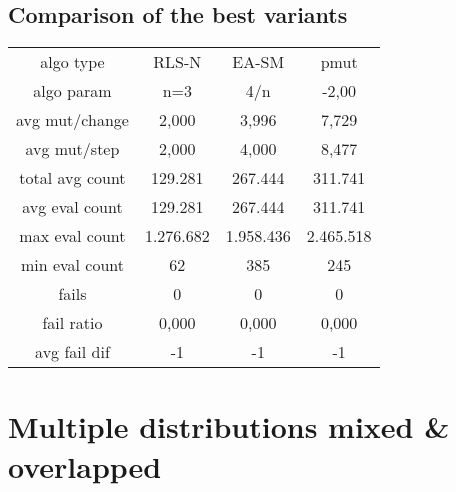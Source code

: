 \subsection{Comparison of the best variants}

\begin{tabular}[h]{cccc}
algo type&               RLS-N&        EA-SM&         pmut\\
algo param&                n=3&          4/n&        -2,00\\
avg mut/change&          2,000&        3,996&        7,729\\
avg mut/step&            2,000&        4,000&        8,477\\
\hline
total avg count&       129.281&      267.444&      311.741\\
avg eval count&        129.281&      267.444&      311.741\\
max eval count&      1.276.682&    1.958.436&    2.465.518\\
min eval count&             62&          385&          245\\
\hline
fails&                       0&            0&            0\\
fail ratio&              0,000&        0,000&        0,000\\
avg fail dif&               -1&           -1&           -1\\
\end{tabular}

\section{Multiple distributions mixed \& overlapped}

